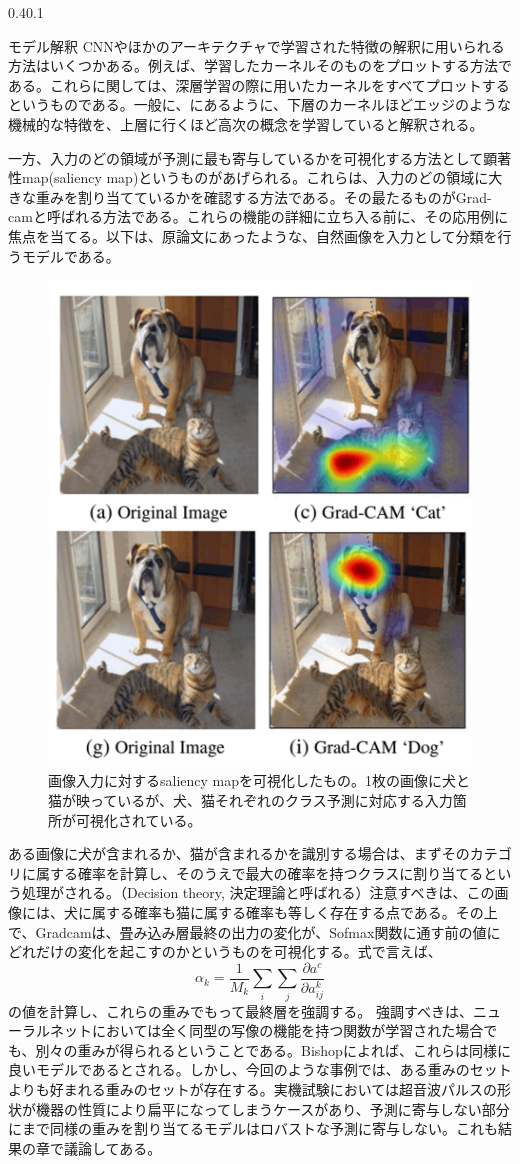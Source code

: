 \documentclass[uplatex]{suribt}
\makeatletter
\renewcommand{\subsection}{%
    \@startsection{subsection}{1}{\z@}%
    {0.4\Cvs}{0.1\Cvs}%
    {\normalfont\normalsize\headfont\raggedright}}
\makeatother
\begin{document}
\subsection{モデル解釈}
CNNやほかのアーキテクチャで学習された特徴の解釈に用いられる方法はいくつかある。例えば、学習したカーネルそのものをプロットする方法である。これらに関しては、深層学習の際に用いたカーネルをすべてプロットするというものである。一般に、\cite{Bishop:DeepLearning24}にあるように、下層のカーネルほどエッジのような機械的な特徴を、上層に行くほど高次の概念を学習していると解釈される。\par
一方、入力のどの領域が予測に最も寄与しているかを可視化する方法として顕著性map(saliency map)というものがあげられる。これらは、入力のどの領域に大きな重みを割り当てているかを確認する方法である。その最たるものがGrad-cam\cite{Selvaraju_2019}と呼ばれる方法である。これらの機能の詳細に立ち入る前に、その応用例に焦点を当てる。以下は、原論文にあったような、自然画像を入力として分類を行うモデルである。
\begin{figure}
    \centering
    \includegraphics[width=0.5\linewidth]{pictures/explanation/grad_cam_explained.png}
    \caption{画像入力に対するsaliency mapを可視化したもの。1枚の画像に犬と猫が映っているが、犬、猫それぞれのクラス予測に対応する入力箇所が可視化されている。}
    \label{fig:gradcam}
\end{figure}
ある画像に犬が含まれるか、猫が含まれるかを識別する場合は、まずそのカテゴリに属する確率を計算し、そのうえで最大の確率を持つクラスに割り当てるという処理がされる。（Decision theory, 決定理論と呼ばれる）注意すべきは、この画像には、犬に属する確率も猫に属する確率も等しく存在する点である。その上で、Gradcamは、畳み込み層最終の出力の変化が、Sofmax関数に通す前の値にどれだけの変化を起こすのかというものを可視化する。式で言えば、
\begin{equation}
    \alpha_k=\frac{1}{M_k}\sum_i\sum_j{\frac{\partial a^c}{\partial a_{ij}^k}}
\end{equation}
の値を計算し、これらの重みでもって最終層を強調する。
強調すべきは、ニューラルネットにおいては全く同型の写像の機能を持つ関数が学習された場合でも、別々の重みが得られるということである。Bishop\cite{PRML}によれば、これらは同様に良いモデルであるとされる。しかし、今回のような事例では、ある重みのセットよりも好まれる重みのセットが存在する。実機試験においては超音波パルスの形状が機器の性質により扁平になってしまうケースがあり、予測に寄与しない部分にまで同様の重みを割り当てるモデルはロバストな予測に寄与しない。これも結果の章で議論してある。
\end{document}
